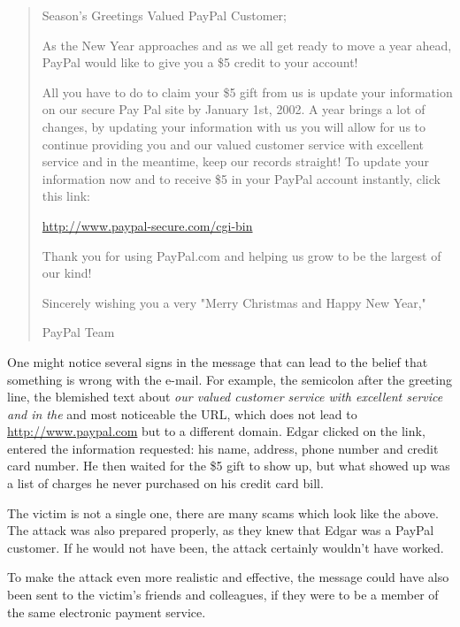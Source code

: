\begin{quote}
Season's Greetings Valued PayPal Customer;

As the New Year approaches and as we all get ready to move a year ahead,
PayPal would like to give you a \$5 credit to your account!

All you have to do to claim your \$5 gift from us is update your information on
our secure Pay Pal site by January 1st, 2002. A year brings a lot of changes,
by updating your information with us you will allow for us to continue
providing you and our valued customer service with excellent service and in the
meantime, keep our records straight! To update your information now and to
receive \$5 in your PayPal account instantly, click this link:

\url{http://www.paypal-secure.com/cgi-bin}

Thank you for using PayPal.com and helping us grow to be the largest of our
kind!

Sincerely wishing you a very "Merry Christmas and Happy New Year,"

PayPal Team

\end{quote}

One might notice several signs in the message that can lead to the belief that
something is wrong with the e-mail. For example, the semicolon after the
greeting line, the blemished text about \textit{\glqq{}our valued customer service with
excellent service and in the\grqq{}} and most noticeable the URL, which does not
lead to \url{http://www.paypal.com} but to a different domain. Edgar clicked on
the link, entered the information requested: his name, address, phone number
and credit card number. He then waited for the \$5 gift to show up, but what
showed up was a list of charges he never purchased on his credit card bill.

The victim is not a single one, there are many scams which look like the above.
The attack was also prepared properly, as they knew that Edgar was a PayPal
customer. If he would not have been, the attack certainly wouldn't have worked.

To make the attack even more realistic and effective, the message could have
also been sent to the victim's friends and colleagues, if they were to be a
member of the same electronic payment service.

